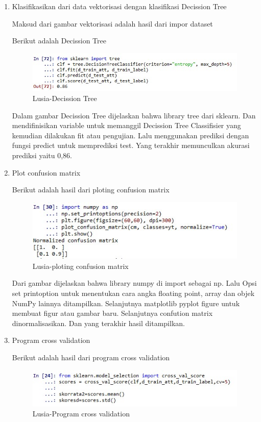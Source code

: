 \begin{enumerate}
\item Klasifikasikan dari data vektorisasi dengan klasifikasi Decission Tree
	\par Maksud dari gambar vektorisasi adalah hasil dari impor dataset
	\par Berikut adalah Decission Tree
		\begin{figure}[ht]
		\centering
		\includegraphics[scale=0.5]{figures/n3b.jpg}
		\caption{Lusia-Decission Tree}
		\label{contoh}
		\end{figure}
	\par Dalam gambar Decission Tree dijelaskan bahwa library tree dari sklearn. Dan mendifinisikan variable untuk memanggil Decission Tree Classifisier yang kemudian dilakukan fit atau pengujian. Lalu menggunakan prediksi dengan fungsi predict untuk memprediksi test. Yang terakhir memunculkan akurasi prediksi yaitu 0,86.

\item Plot confusion matrix
	\par Berikut adalah hasil dari ploting confusion matrix
		\begin{figure}[ht]
		\centering
		\includegraphics[scale=0.5]{figures/n6.jpg}
		\caption{Lusia-ploting confusion matrix}
		\label{contoh}
		\end{figure}
	\par Dari gambar dijelaskan bahwa library numpy di import sebagai np. Lalu 	Opsi set printoption untuk menentukan cara angka floating point, array dan objek NumPy lainnya ditampilkan. Selanjutnya matplotlib pyplot figure untuk membuat figur atau gambar baru. Selanjutnya confution matrix dinormalisasikan. Dan yang terakhir hasil ditampilkan.

\item Program cross validation
	\par Berikut adalah hasil dari program cross validation
		\begin{figure}[ht]
		\centering
		\includegraphics[scale=0.5]{figures/n7.jpg}
		\caption{Lusia-Program cross validation}
		\label{contoh}
		\end{figure}
		

\end{enumerate}
